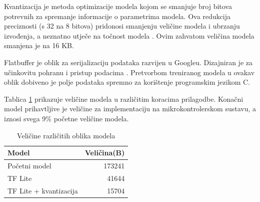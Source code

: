 Kvantizacija je metoda optimizacije modela kojom se smanjuje broj bitova potrevnih za
spremanje informacije o parametrima modela. Ova redukcija preciznosti (s 32 na 8 bitova)
pridonosi smanjenju veličine modela i ubrzanju izvođenja, a neznatno utječe na točnost
modela \cite{}. Ovim zahvatom veličina modela smanjena je na 16 KB. 

Flatbuffer je oblik za serijalizaciju podataka razvijen u Googleu. Dizajniran je
za učinkovitu pohranu i pristup podacima \cite{}. 
Pretvorbom treniranog modela u ovakav oblik
dobiveno je polje podataka spremno za korištenje programskim jezikom C.

Tablica \ref{tab:model_sizes} prikazuje veličine modela u različitim koracima prilagodbe.
Konačni model prihavtljive je veličine za implementaciju na mikrokontrolerskom sustavu, 
a iznosi svega 9\% početne veličine modela.

\begin{table}[htb]
    \centering
    \begin{tabular}{|l|r|}
        \hline
        \textbf{Model} & \textbf{Veličina(B)} \\ \hline
        Početni model & 173241\\ \hline
        TF Lite & 41644 \\ \hline
        TF Lite + kvantizacija & 15704 \\ \hline
    \end{tabular}
    \caption{Veličine različitih oblika modela}
    \label{tab:model_sizes}
\end{table}